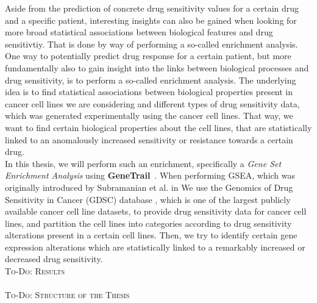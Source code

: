 Aside from the prediction of concrete drug sensitivity values for a certain drug and a specific patient, interesting insights can also be gained when looking for more broad statistical associations between biological features and drug sensitivtiy. That is done by way of performing a so-called enrichment analysis.
One way to potentially predict drug response for a certain patient, but more fundamentally also to gain insight into the links between biological processes and drug sensitivity, is to perform a so-called enrichment analysis.
The underlying idea is to find statistical associations between biological properties present in cancer cell lines we are considering and different types of drug sensitivity data, which was generated experimentally using the cancer cell lines.
That way, we want to find certain biological properties about the cell lines, that are statistically linked to an anomalously increased sensitivity or resistance towards a certain drug.\\
In this thesis, we will perform such an enrichment, specifically a \textit{Gene Set Enrichment Analysis} using \textbf{GeneTrail}~\cite{genetrail}.
When performing GSEA, which was originally introduced by Subramanian et al. in 
We use the Genomics of Drug Sensitivity in Cancer (GDSC) database \cite{gdsc}, which is one of the largest publicly available cancer cell line datasets, to provide drug sensitivity data for cancer cell lines, and partition the cell lines into categories according to drug sensitivity alterations present in a certain  cell lines.
Then, we try to identify certain gene expression alterations which are statistically linked to a remarkably increased or decreased drug sensitivity.\\


\textsc{To-Do: Results}\\
\\
\textsc{To-Do: Structure of the Thesis}